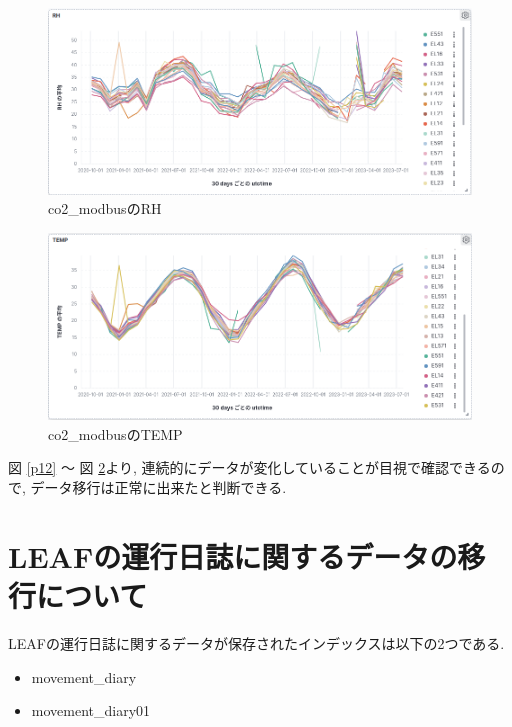 \begin{figure}[h]
  \begin{center}
    \includegraphics[width=160mm]{sotu/figure/rh.png}
    \caption{co2\_modbusのRH}
    \label{p13}
  \end{center}
\end{figure}

\begin{figure}[h]
  \begin{center}
    \includegraphics[width=160mm]{sotu/figure/temp.png}
    \caption{co2\_modbusのTEMP}
    \label{p14}
  \end{center}
\end{figure}

図 \ref{p12} 〜 図 \ref{p14}より, 連続的にデータが変化していることが目視で確認できるので, データ移行は正常に出来たと判断できる.

\section{LEAFの運行日誌に関するデータの移行について}

LEAFの運行日誌に関するデータが保存されたインデックスは以下の2つである.

\begin{itemize}
  \item movement\_diary
  \item movement\_diary01
\end{itemize}

